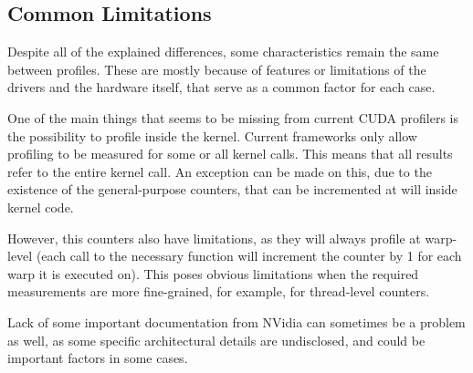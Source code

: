 \subsection{Common Limitations}
\label{sec:610}

Despite all of the explained differences, some characteristics remain the same between profiles. These are mostly because of features or limitations of the drivers and the hardware itself, that serve as a common factor for each case.

One of the main things that seems to be missing from current CUDA profilers is the possibility to profile inside the kernel. Current frameworks only allow profiling to be measured for some or all kernel calls. This means that all results refer to the entire kernel call. An exception can be made on this, due to the existence of the general-purpose counters, that can be incremented at will inside kernel code.

However, this counters also have limitations, as they will always profile at warp-level (each call to the necessary function will increment the counter by 1 for each warp it is executed on). This poses obvious limitations when the required measurements are more fine-grained, for example, for thread-level counters.

Lack of some important documentation from NVidia can sometimes be a problem as well, as some specific architectural details are undisclosed, and could be important factors in some cases. 
